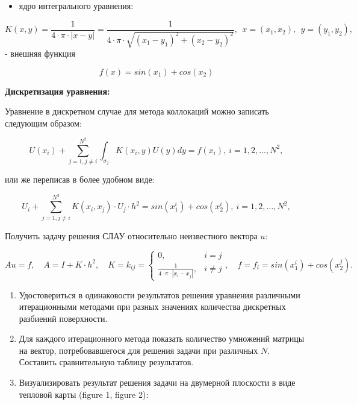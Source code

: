 \documentclass[
]{article}
\providecommand{\tightlist}{%
  \setlength{\itemsep}{0pt}\setlength{\parskip}{0pt}}
\begin{document}
\begin{itemize}
\tightlist
\item
  ядро интегрального уравнения:
\end{itemize}

\[
K(x, y) = \frac{1}{4\cdot \pi \cdot |x - y|} = \frac{1}{4\cdot \pi \cdot \sqrt{(x_1 - y_1)^2 + (x_2 - y_2)^2}}, \ \ x = (x_1, x_2), \ \ y = (y_1, y_2),
\] - внешняя функция

\[
f(x) = sin(x_1) + cos(x_2)
\]

\textbf{Дискретизация уравнения:}

Уравнение в дискретном случае для метода коллокаций можно записать
следующим образом:

\[
U(x_i) + \sum_{j = 1, j\ne i}^{N^2}\int_{\sigma_j} K(x_i, y)U(y) dy = f(x_i), \ i = 1, 2, \dots, N^2,
\]

или же переписав в более удобном виде:

\[
U_i + \sum_{j = 1, j\ne i}^{N^2} K(x_i, x_j) \cdot U_j \cdot h^2 = sin(x_1^i) + cos(x_2^i), \ i = 1, 2, \dots, N^2,
\]

Получить задачу решения СЛАУ относительно неизвестного вектора \(u\):

\[
Au = f, \quad A = I + K\cdot h^2, \quad K = k_{ij} = \left\{ \begin{matrix}0, & i = j\\ \frac{1}{4 \cdot \pi \cdot |x_i - x_j|}, & i\ne j\end{matrix} \right. ,\quad f = f_i = sin(x_1^i) + cos(x_2^j).
\]

\begin{enumerate}
\def\labelenumi{\arabic{enumi}.}
\setcounter{enumi}{3}
\item
  Удостовериться в одинаковости результатов решения уравнения различными
  итерационными методами при разных значениях количества дискретных
  разбиений поверхности.
\item
  Для каждого итерационного метода показать количество умножений матрицы
  на вектор, потребовавшегося для решения задачи при различных \(N\).
  Составить сравнительную таблицу результатов.
\item
  Визуализировать результат решения задачи на двумерной плоскости в виде
  тепловой карты (figure 1, figure 2):
\end{enumerate}
\end{document}
